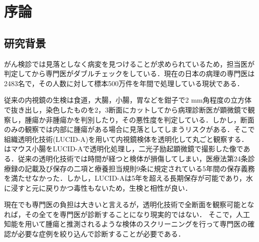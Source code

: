\chapter{序論}
\label{chap_intro}

\section{研究背景}
がん検診では見落としなく病変を見つけることが求められているため，担当医が判定してから専門医がダブルチェックをしている．現在の日本の病理の専門医は2483名\cite{pathology}で，その人数に対して標本500万件を年間で処理している現状である．

従来の内視鏡の生検は食道，大腸，小腸，胃などを鉗子で2 mm角程度の立方体で抜き出し，染色したものを2，3断面にカットしてから病理診断医が顕微鏡で観察し，腫瘍か非腫瘍かを判別したり，その悪性度を判定している．しかし，断面のみの観察では内部に腫瘍がある場合に見落としてしまうリスクがある．そこで組織透明化技術(LUCID-A)\cite{sekitani2016ultraflexible}を用いて内視鏡検体を透明化して丸ごと観察する．はマウス小腸をLUCID-Aで透明化処理し，二光子励起顕微鏡で撮影した像である．従来の透明化技術では時間が経つと検体が損傷してしまい，医療法第24条診療録の記載及び保存の二項と療養担当規則9条に規定されている5年間の保存義務を満たせなかった．しかし，LUCID-Aは5年を超える長期保存が可能であり，水に浸すと元に戻りかつ毒性もないため，生検と相性が良い．

現在でも専門医の負担は大きいと言えるが，透明化技術で全断面を観察可能となれば，その全てを専門医が診断することになり現実的ではない．
そこで，人工知能を用いて腫瘍と推測されるような検体のスクリーニングを行って専門医の確認が必要な症例を絞り込んで診断することが必要である．

